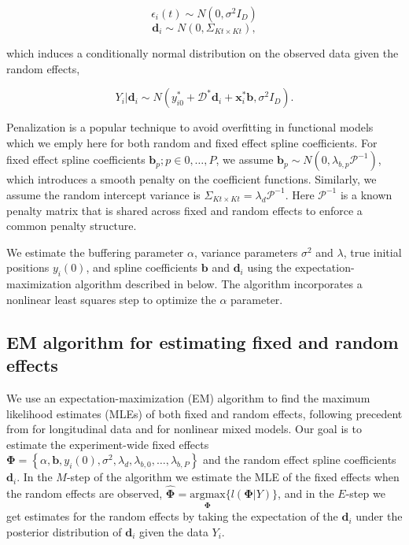 \documentclass[preprint]{JASA}
\begin{document}
\[\epsilon_i(t) \sim N(0, \sigma^2I_D)\]
\[\mathbf{d}_i \sim N(0, \Sigma_{Kt\times Kt}),\]

\noindent which induces a conditionally normal distribution on the
observed data given the random effects,

\[Y_i| \mathbf{d}_i \sim N\left(y_{i0}^* + \mathcal{D}^*\mathbf{d}_i+  \mathbf{x}_i^*\mathbf{b}, \sigma^2I_D \right).\]

\noindent Penalization is a popular technique to avoid overfitting in
functional models which we emply here for both random and fixed effect
spline coefficients. For fixed effect spline coefficients
\(\mathbf{b}_p; p\in 0,\ldots,P\), we assume
\(\mathbf{b}_p \sim N(0, \lambda_{b,p}\mathcal{P}^{-1})\), which
introduces a smooth penalty on the coefficient functions. Similarly, we
assume the random intercept variance is
\(\Sigma_{Kt\times Kt} = \lambda_d\mathcal{P}^{-1}\). Here
\(\mathcal{P}^{-1}\) is a known penalty matrix that is shared across
fixed and random effects to enforce a common penalty structure.

We estimate the buffering parameter \(\alpha\), variance parameters
\(\sigma^2\) and \(\lambda\), true initial positions \(y_i(0)\), and
spline coefficients \(\mathbf{b}\) and \(\mathbf{d}_i\) using the
expectation-maximization algorithm described in below. The algorithm
incorporates a nonlinear least squares step to optimize the \(\alpha\)
parameter.

\hypertarget{em-algorithm-for-estimating-fixed-and-random-effects}{%
\subsection{EM algorithm for estimating fixed and random
effects}\label{em-algorithm-for-estimating-fixed-and-random-effects}}

\label{sec:em_algorithm}

We use an expectation-maximization (EM) algorithm to find the maximum
likelihood estimates (MLEs) of both fixed and random effects, following
precedent from \cite{laird1982} for longitudinal data and
\cite{walker1996} for nonlinear mixed models. Our goal is to estimate
the experiment-wide fixed effects
\(\mathbf{\Phi} = \left\{\alpha, \mathbf{b}, y_i(0), \sigma^2, \lambda_d, \lambda_{b, 0}, \ldots, \lambda_{b, P}\right\}\)
and the random effect spline coefficients \(\mathbf{d}_i\). In the
\(M\)-step of the algorithm we estimate the MLE of the fixed effects
when the random effects are observed,
\(\widehat{\mathbf{\Phi}} = \underset{\mathbf{\Phi}}{\mathrm{argmax}}\{l(\mathbf{\Phi} | Y)\}\),
and in the \(E\)-step we get estimates for the random effects by taking
the expectation of the \(\mathbf{d}_i\) under the posterior distribution
of \(\mathbf{d}_i\) given the data \(Y_i\).
\end{document}
